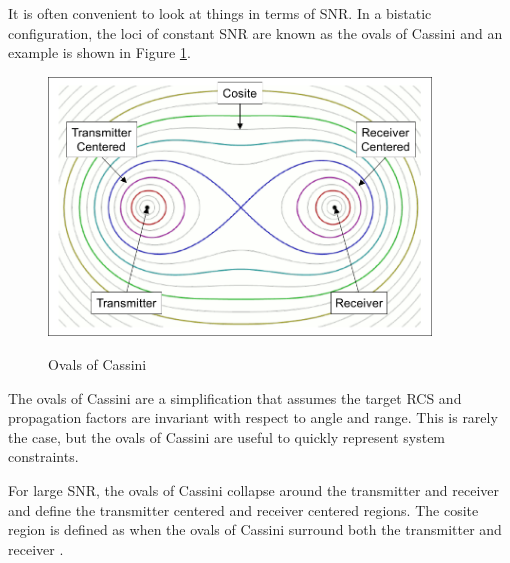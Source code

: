It is often convenient to look at things in terms of SNR. In a bistatic configuration, the loci of constant SNR are known as the ovals of Cassini \cite{willis_bistatic} and an example is shown in Figure \ref{intro_fig:3}.
\begin{figure}[H]
  \begin{center}
\includegraphics[width=4in]{../media/multistatic/ovals_of_cassini.png}
  \end{center}
  \renewcommand{\baselinestretch}{1} \small\normalsize
  \begin{quote}
    \caption[Ovals of Cassini]{Ovals of Cassini\label{intro_fig:3}}
  \end{quote}
\end{figure}
\renewcommand{\baselinestretch}{2} \small\normalsize
The ovals of Cassini are a simplification that assumes the target RCS and propagation factors are invariant with respect to angle and range. This is rarely the case, but the ovals of Cassini are useful to quickly represent system constraints.

For large SNR, the ovals of Cassini collapse around the transmitter and receiver and define the transmitter centered and receiver centered regions. The cosite region is defined as when the ovals of Cassini surround both the transmitter and receiver \cite {willis_bistatic}.
